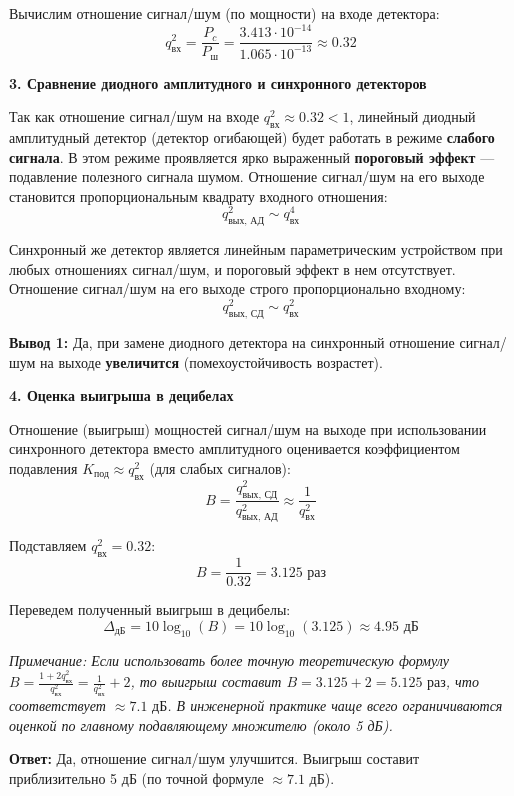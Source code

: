 Вычислим отношение сигнал/шум (по мощности) на входе детектора:
\begin{equation*}
    q_{\text{вх}}^2 = \frac{P_c}{P_{\text{ш}}} = \frac{3.413 \cdot 10^{-14}}{1.065 \cdot 10^{-13}} \approx 0.32
\end{equation*}

\vspace{1em}
\textbf{3. Сравнение диодного амплитудного и синхронного детекторов}

Так как отношение сигнал/шум на входе $q_{\text{вх}}^2 \approx 0.32 < 1$, линейный диодный амплитудный детектор (детектор огибающей) будет работать в режиме \textbf{слабого сигнала}. В этом режиме проявляется ярко выраженный \textbf{пороговый эффект} — подавление полезного сигнала шумом. Отношение сигнал/шум на его выходе становится пропорциональным квадрату входного отношения:
\begin{equation*}
    q_{\text{вых, АД}}^2 \sim q_{\text{вх}}^4
\end{equation*}

Синхронный же детектор является линейным параметрическим устройством при любых отношениях сигнал/шум, и пороговый эффект в нем отсутствует. Отношение сигнал/шум на его выходе строго пропорционально входному:
\begin{equation*}
    q_{\text{вых, СД}}^2 \sim q_{\text{вх}}^2
\end{equation*}

\textbf{Вывод 1:} Да, при замене диодного детектора на синхронный отношение сигнал/шум на выходе \textbf{увеличится} (помехоустойчивость возрастет).

\vspace{1em}
\textbf{4. Оценка выигрыша в децибелах}

Отношение (выигрыш) мощностей сигнал/шум на выходе при использовании синхронного детектора вместо амплитудного оценивается коэффициентом подавления $K_{\text{под}} \approx q_{\text{вх}}^2$ (для слабых сигналов):
\begin{equation*}
    B = \frac{q_{\text{вых, СД}}^2}{q_{\text{вых, АД}}^2} \approx \frac{1}{q_{\text{вх}}^2}
\end{equation*}

Подставляем $q_{\text{вх}}^2 = 0.32$:
\begin{equation*}
    B = \frac{1}{0.32} = 3.125 \text{ раз}
\end{equation*}

Переведем полученный выигрыш в децибелы:
\begin{equation*}
    \Delta_{\text{дБ}} = 10 \log_{10}(B) = 10 \log_{10}(3.125) \approx 4.95 \text{ дБ}
\end{equation*}

\textit{Примечание: Если использовать более точную теоретическую формулу $B = \frac{1+2q_{\text{вх}}^2}{q_{\text{вх}}^2} = \frac{1}{q_{\text{вх}}^2} + 2$, то выигрыш составит $B = 3.125 + 2 = 5.125 \text{ раз}$, что соответствует $\approx 7.1 \text{ дБ}$. В инженерной практике чаще всего ограничиваются оценкой по главному подавляющему множителю (около 5 дБ).}

\textbf{Ответ:} Да, отношение сигнал/шум улучшится. Выигрыш составит приблизительно 5 дБ (по точной формуле $\approx 7.1$ дБ).